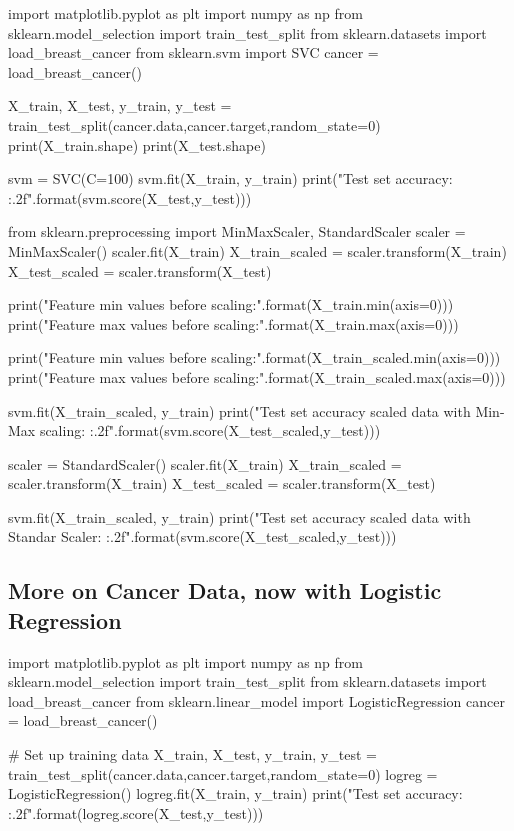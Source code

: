 \documentclass[%
oneside,                 %
final,                   %
10pt]{article}
\begin{document}
\bpycod
import matplotlib.pyplot as plt
import numpy as np
from sklearn.model_selection import  train_test_split 
from sklearn.datasets import load_breast_cancer
from sklearn.svm import SVC
cancer = load_breast_cancer()

X_train, X_test, y_train, y_test = train_test_split(cancer.data,cancer.target,random_state=0)
print(X_train.shape)
print(X_test.shape)

svm = SVC(C=100)
svm.fit(X_train, y_train)
print("Test set accuracy: {:.2f}".format(svm.score(X_test,y_test)))

from sklearn.preprocessing import MinMaxScaler, StandardScaler
scaler = MinMaxScaler()
scaler.fit(X_train)
X_train_scaled = scaler.transform(X_train)
X_test_scaled = scaler.transform(X_test)

print("Feature min values before scaling:\n {}".format(X_train.min(axis=0)))
print("Feature max values before scaling:\n {}".format(X_train.max(axis=0)))

print("Feature min values before scaling:\n {}".format(X_train_scaled.min(axis=0)))
print("Feature max values before scaling:\n {}".format(X_train_scaled.max(axis=0)))


svm.fit(X_train_scaled, y_train)
print("Test set accuracy scaled data with Min-Max scaling: {:.2f}".format(svm.score(X_test_scaled,y_test)))

scaler = StandardScaler()
scaler.fit(X_train)
X_train_scaled = scaler.transform(X_train)
X_test_scaled = scaler.transform(X_test)

svm.fit(X_train_scaled, y_train)
print("Test set accuracy scaled data with Standar Scaler: {:.2f}".format(svm.score(X_test_scaled,y_test)))

\epycod

\subsection{More on Cancer Data, now with Logistic Regression}


\bpycod
import matplotlib.pyplot as plt
import numpy as np
from sklearn.model_selection import  train_test_split 
from sklearn.datasets import load_breast_cancer
from sklearn.linear_model import LogisticRegression
cancer = load_breast_cancer()

# Set up training data
X_train, X_test, y_train, y_test = train_test_split(cancer.data,cancer.target,random_state=0)
logreg = LogisticRegression()
logreg.fit(X_train, y_train)
print("Test set accuracy: {:.2f}".format(logreg.score(X_test,y_test)))
\end{document}

